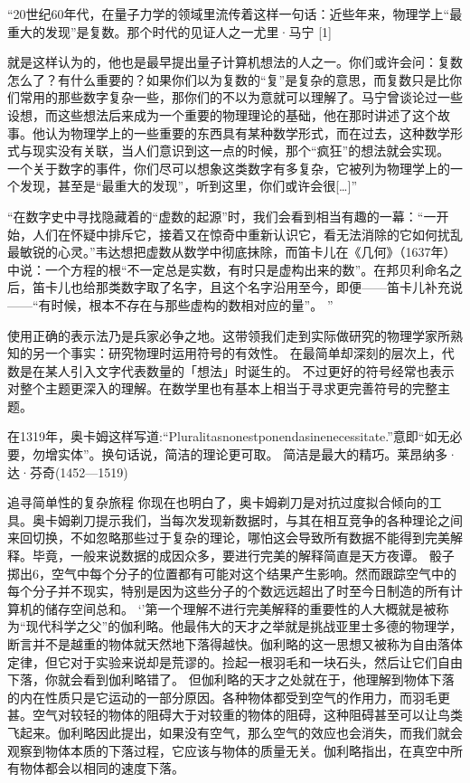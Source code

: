 “20世纪60年代，在量子力学的领域里流传着这样一句话：近些年来，物理学上“最重大的发现”是复数。那个时代的见证人之一尤里·马宁
[1]

就是这样认为的，他也是最早提出量子计算机想法的人之一。你们或许会问：复数怎么了？有什么重要的？如果你们以为复数的“复”是复杂的意思，而复数只是比你们常用的那些数字复杂一些，那你们的不以为意就可以理解了。马宁曾谈论过一些设想，而这些想法后来成为一个重要的物理理论的基础，他在那时讲述了这个故事。他认为物理学上的一些重要的东西具有某种数学形式，而在过去，这种数学形式与现实没有关联，当人们意识到这一点的时候，那个“疯狂”的想法就会实现。
一个关于数字的事件，你们尽可以想象这类数字有多复杂，它被列为物理学上的一个发现，甚至是“最重大的发现”，听到这里，你们或许会很[…]”


“在数字史中寻找隐藏着的“虚数的起源”时，我们会看到相当有趣的一幕：“一开始，人们在怀疑中排斥它，接着又在惊奇中重新认识它，看无法消除的它如何扰乱最敏锐的心灵。”韦达想把虚数从数学中彻底抹除，而笛卡儿在《几何》（1637年）中说：一个方程的根“不一定总是实数，有时只是虚构出来的数”。在邦贝利命名之后，笛卡儿也给那类数字取了名字，且这个名字沿用至今，即便——笛卡儿补充说——“有时候，根本不存在与那些虚构的数相对应的量”。
”

使用正确的表示法乃是兵家必争之地。这带领我们走到实际做研究的物理学家所熟知的另一个事实：研究物理时运用符号的有效性。
在最简单却深刻的层次上，代数是在某人引入文字代表数量的「想法」时诞生的。
不过更好的符号经常也表示对整个主题更深入的理解。在数学里也有基本上相当于寻求更完善符号的完整主题。



在1319年，奥卡姆这样写道:“Pluralitasnonestponendasinenecessitate.”意即“如无必要，勿增实体”。换句话说，简洁的理论更可取。
简洁是最大的精巧。莱昂纳多·达·芬奇(1452—1519)

追寻简单性的复杂旅程
你现在也明白了，奥卡姆剃刀是对抗过度拟合倾向的工具。奥卡姆剃刀提示我们，当每次发现新数据时，与其在相互竞争的各种理论之间来回切换，不如忽略那些过于复杂的理论，哪怕这会导致所有数据不能得到完美解释。毕竟，一般来说数据的成因众多，要进行完美的解释简直是天方夜谭。
骰子掷出6，空气中每个分子的位置都有可能对这个结果产生影响。然而跟踪空气中的每个分子并不现实，特别是因为这些分子的个数远远超出了时至今日制造的所有计算机的储存空间总和。
‘’第一个理解不进行完美解释的重要性的人大概就是被称为“现代科学之父”的伽利略。他最伟大的天才之举就是挑战亚里士多德的物理学，断言并不是越重的物体就天然地下落得越快。伽利略的这一思想又被称为自由落体定律，但它对于实验来说却是荒谬的。捡起一根羽毛和一块石头，然后让它们自由下落，你就会看到伽利略错了。
但伽利略的天才之处就在于，他理解到物体下落的内在性质只是它运动的一部分原因。各种物体都受到空气的作用力，而羽毛更甚。空气对较轻的物体的阻碍大于对较重的物体的阻碍，这种阻碍甚至可以让鸟类飞起来。伽利略因此提出，如果没有空气，那么空气的效应也会消失，而我们就会观察到物体本质的下落过程，它应该与物体的质量无关。伽利略指出，在真空中所有物体都会以相同的速度下落。

